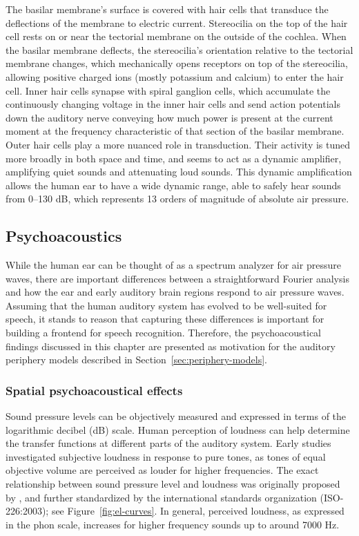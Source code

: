 The basilar membrane's surface is covered
with hair cells that transduce
the deflections of the membrane
to electric current.
Stereocilia on the top of the hair cell
rests on or near the tectorial membrane
on the outside of the cochlea.
When the basilar membrane deflects,
the stereocilia's orientation
relative to the tectorial membrane changes,
which mechanically opens receptors
on top of the stereocilia,
allowing positive charged ions
(mostly potassium and calcium)
to enter the hair cell.
Inner hair cells synapse with
spiral ganglion cells,
which accumulate the continuously
changing voltage in the inner hair cells
and send action potentials
down the auditory nerve
conveying how much power
is present at the current moment
at the frequency characteristic
of that section of the basilar membrane.
Outer hair cells play a more nuanced
role in transduction.
Their activity is tuned
more broadly in both space and time,
and seems to act as a dynamic amplifier,
amplifying quiet sounds and
attenuating loud sounds.
This dynamic amplification allows
the human ear to have a wide dynamic range,
able to safely hear sounds from 0--130 dB,
which represents 13 orders of magnitude
of absolute air pressure.

\subsection{Psychoacoustics}
\label{sec:psychoacoustics}

While the human ear can be thought of
as a spectrum analyzer for air pressure waves,
there are important differences between
a straightforward Fourier analysis
and how the ear and early auditory brain regions
respond to air pressure waves.
Assuming that the human
auditory system has evolved to be
well-suited for speech,
it stands to reason that
capturing these differences
is important for building
a frontend for speech recognition.
Therefore, the psychoacoustical findings
discussed in this chapter
are presented as motivation for the
auditory periphery models described
in Section~\ref{sec:periphery-models}.


\subsubsection{Spatial psychoacoustical effects}

Sound pressure levels can be objectively measured
and expressed in terms of the logarithmic
decibel (dB) scale.
Human perception of loudness can help
determine the transfer functions
at different parts of the auditory system.
Early studies investigated
subjective loudness in response
to pure tones,
as tones of equal objective volume
are perceived as louder for higher frequencies.
The exact relationship between
sound pressure level and
loudness was originally proposed
by \citet{fletcher1933},
and further standardized
by the international standards organization
(ISO-226:2003);
see Figure~\ref{fig:el-curves}.
In general, perceived loudness,
as expressed in the phon scale,
increases for higher frequency sounds
up to around 7000 Hz.

